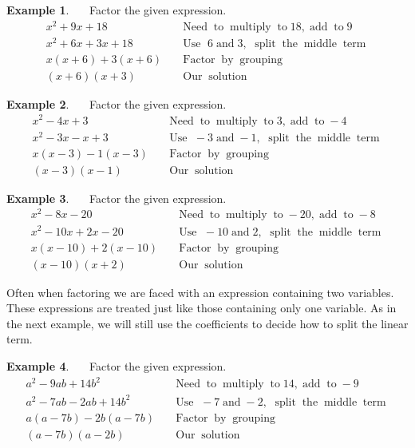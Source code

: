 \documentclass[12pt]{book}
\theoremstyle{definition}
\newtheorem{example}{Example}
\newcommand{\tmop}[1]{\ensuremath{\operatorname{#1}}}
\begin{document}
\begin{example}~~~Factor the given expression.
  \begin{eqnarray*}
    x^2 + 9 x + 18 &  & \tmop{Need} \tmop{to} \tmop{multiply} \tmop{to} 18,
    \tmop{add} \tmop{to} 9\\
    x^2 + 6 x + 3 x + 18 &  & \tmop{Use~}6 \tmop{and} 3, \tmop{~split} \tmop{the}
    \tmop{middle} \tmop{term}\\
    x (x + 6) + 3 (x + 6) &  & \tmop{Factor} \tmop{by} \tmop{grouping}\\
    (x + 6) (x + 3) &  & \tmop{Our} \tmop{solution}
  \end{eqnarray*}
\end{example}	
\begin{example}~~~Factor the given expression.
  \begin{eqnarray*}
    x^2 - 4 x + 3 &  & \tmop{Need} \tmop{to} \tmop{multiply} \tmop{to} 3,
    \tmop{add} \tmop{to} - 4\\
    x^2 - 3 x - x + 3 &  & \tmop{Use~}- 3 \tmop{and} - 1, \tmop{~split} \tmop{the}
    \tmop{middle} \tmop{term}\\
    x (x - 3) - 1 (x - 3) &  & \tmop{Factor} \tmop{by} \tmop{grouping}\\
    (x - 3) (x - 1) &  & \tmop{Our} \tmop{solution}
  \end{eqnarray*}
\end{example}	
\begin{example}~~~Factor the given expression.
  \begin{eqnarray*}
    x^2 - 8 x - 20 &  & \tmop{Need} \tmop{to} \tmop{multiply} \tmop{to} - 20,
    \tmop{add} \tmop{to} - 8\\
    x^2 - 10 x + 2 x - 20 &  & \tmop{Use~}- 10 \tmop{and} 2, \tmop{~split} \tmop{the}
    \tmop{middle} \tmop{term}\\
    x (x - 10) + 2 (x - 10) &  & \tmop{Factor} \tmop{by} \tmop{grouping}\\
    (x - 10) (x + 2) &  & \tmop{Our} \tmop{solution}
  \end{eqnarray*}
\end{example}	
Often when factoring we are faced with an expression containing two variables. These expressions are treated just like those containing only one variable.  As in the next example, we will still use the coefficients to decide how to split the linear term.
\begin{example}~~~Factor the given expression.
  \begin{eqnarray*}
    a^2 - 9 a b + 14 b^2 &  & \tmop{Need} \tmop{to} \tmop{multiply} \tmop{to}
    14, \tmop{add} \tmop{to} - 9\\
    a^2 - 7 a b - 2 a b + 14 b^2 &  & \tmop{Use~}- 7 \tmop{and} - 2, \tmop{~split}
    \tmop{the} \tmop{middle} \tmop{term}\\
    a (a - 7 b) - 2 b (a - 7 b) &  & \tmop{Factor} \tmop{by} \tmop{grouping}\\
    (a - 7 b) (a - 2 b) &  & \tmop{Our} \tmop{solution}
  \end{eqnarray*}
\end{example}	
\end{document}
